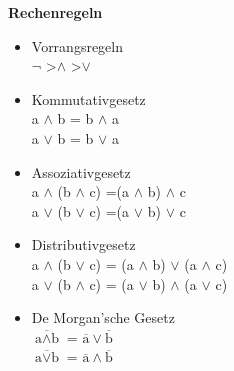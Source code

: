 \textbf{Rechenregeln} \\
\begin{itemize}
	\item Vorrangsregeln\\
	$\lnot$ \textgreater $\land$ \textgreater $\lor$
	\item Kommutativgesetz \\
	a $\land$ b = b $\land$ a \\
	a $\lor$ b = b $\lor$ a 
	\item Assoziativgesetz \\
	a $\land$ (b $\land$ c) =(a $\land$ b) $\land$ c \\
	a $\lor$ (b $\lor$ c) =(a $\lor$ b) $\lor$ c
	\item Distributivgesetz \\
	a $\land$ (b $\lor$ c) = (a $\land$ b) $\lor$ (a $\land$ c) \\
	a $\lor$ (b $\land$ c) = (a $\lor$ b) $\land$ (a $\lor$ c)
	\item De Morgan'sche Gesetz \\
	$\overline{\text{a}\land\text{b}}$ = $\overline{\text{a}} \lor \overline{\text{b}}$ \\
	$\overline{\text{a}\lor\text{b}}$ = $\overline{\text{a}} \land \overline{\text{b}}$ 
\end{itemize}



